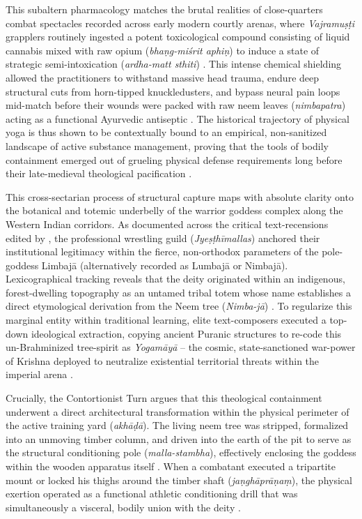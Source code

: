 \documentclass[11pt,twoside,letterpaper]{article}
\begin{document}
This subaltern pharmacology matches the brutal realities of close-quarters combat spectacles recorded across early modern courtly arenas, where \textit{Vajramu\d{s}\d{t}i} grapplers routinely ingested a potent toxicological compound consisting of liquid cannabis mixed with raw opium (\textit{bha\d{n}g-mi\'srit aphi\d{n}}) to induce a state of strategic semi-intoxication (\textit{ardha-matt sthiti}) \citep{Sandesara1948}. This intense chemical shielding allowed the practitioners to withstand massive head trauma, endure deep structural cuts from horn-tipped knuckledusters, and bypass neural pain loops mid-match before their wounds were packed with raw neem leaves (\textit{nimbapatra}) acting as a functional Ayurvedic antiseptic \citep{Sandesara1948}. The historical trajectory of physical yoga is thus shown to be contextually bound to an empirical, non-sanitized landscape of active substance management, proving that the tools of bodily containment emerged out of grueling physical defense requirements long before their late-medieval theological pacification \citep{Sandesara1948, Wujastyk2025}.

This cross-sectarian process of structural capture maps with absolute clarity onto the botanical and totemic underbelly of the warrior goddess complex along the Western Indian corridors. As documented across the critical text-recensions edited by \citet{MP_7_v32}, the professional wrestling guild (\textit{Jye\d{s}\d{t}h\={i}mallas}) anchored their institutional legitimacy within the fierce, non-orthodox parameters of the pole-goddess Limbaj\={a} (alternatively recorded as Lumbaj\={a} or Nimbaj\={a}). Lexicographical tracking reveals that the deity originated within an indigenous, forest-dwelling topography as an untamed tribal totem whose name establishes a direct etymological derivation from the Neem tree (\textit{Nimba-j\={a}}) \citep{Abbasi2001, Sandesara1948}. To regularize this marginal entity within traditional learning, elite text-composers executed a top-down ideological extraction, copying ancient Puranic structures to re-code this un-Brahminized tree-spirit as \textit{Yogam\={a}y\={a}} -- the cosmic, state-sanctioned war-power of Krishna deployed to neutralize existential territorial threats within the imperial arena \citep{Das1968, Sandesara1948}.

Crucially, the Contortionist Turn argues that this theological containment underwent a direct architectural transformation within the physical perimeter of the active training yard (\textit{akh\={a}\d{d}\={a}}). The living neem tree was stripped, formalized into an unmoving timber column, and driven into the earth of the pit to serve as the structural conditioning pole (\textit{malla-stambha}), effectively enclosing the goddess within the wooden apparatus itself \citep{MP_7_v33, Khasgivale1929}. When a combatant executed a tripartite mount or locked his thighs around the timber shaft (\textit{ja\d{n}gh\={a}pr\={a}\d{n}a\d{m}}), the physical exertion operated as a functional athletic conditioning drill that was simultaneously a visceral, bodily union with the deity \citep{MP_7_v34}. 
\end{document}
